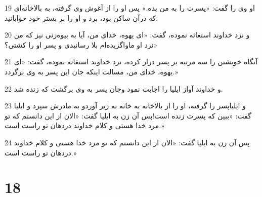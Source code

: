 \par 19 او وی را گفت: «پسرت را به من بده.» پس او را از آغوش وی گرفته، به بالاخانه‌ای که درآن ساکن بود، برد و او را بر بستر خود خوابانید.
\par 20 و نزد خداوند استغاثه نموده، گفت: «ای یهوه، خدای من، آیا به بیوه‌زنی نیز که من نزد او ماواگزیده‌ام بلا رسانیدی و پسر او را کشتی؟»
\par 21 آنگاه خویشتن را سه مرتبه بر پسر دراز کرده، نزد خداوند استغاثه نموده، گفت: «ای یهوه، خدای من، مسالت اینکه جان این پسر به وی برگردد.»
\par 22 و خداوند آواز ایلیا را اجابت نمود وجان پسر به وی برگشت که زنده شد.
\par 23 و ایلیاپسر را گرفته، او را از بالاخانه به خانه به زیر آوردو به مادرش سپرد و ایلیا گفت: «ببین که پسرت زنده است!پس آن زن به ایلیا گفت: «الان از این دانستم که تو مرد خدا هستی و کلام خداوند دردهان تو راست است.»
\par 24 پس آن زن به ایلیا گفت: «الان از این دانستم که تو مرد خدا هستی و کلام خداوند دردهان تو راست است.»
 
\chapter{18}

